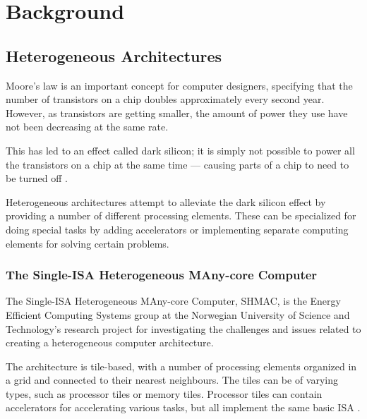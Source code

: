 \chapter{Background}
\label{cha:background}

\section{Heterogeneous Architectures}
\label{sec:heterogeneous}

Moore's law is an important concept for computer designers, specifying that the
number of transistors on a chip doubles approximately every second year. However,
as transistors are getting smaller, the amount of power they use have not been
decreasing at the same rate.

This has led to an effect called dark silicon; it is simply not possible to
power all the transistors on a chip at the same time --- causing parts of
a chip to need to be turned off \cite{dark-silicon}.

Heterogeneous architectures attempt to alleviate the dark silicon effect by
providing a number of different processing elements. These can be specialized for
doing special tasks by adding accelerators or implementing separate computing
elements for solving certain problems.

\subsection{The Single-ISA Heterogeneous MAny-core Computer}
\label{sec:shmac}
The Single-ISA Heterogeneous MAny-core Computer, SHMAC, is the Energy Efficient Computing Systems group
at the Norwegian University of Science and Technology's research project for investigating the
challenges and issues related to creating a heterogeneous computer architecture.

The architecture is tile-based, with a number of processing elements organized
in a grid and connected to their nearest neighbours. The tiles can be of varying
types, such as processor tiles or memory tiles. Processor tiles can contain
accelerators for accelerating various tasks, but all implement the same basic
ISA \cite{shmac-plan}.

%
%

